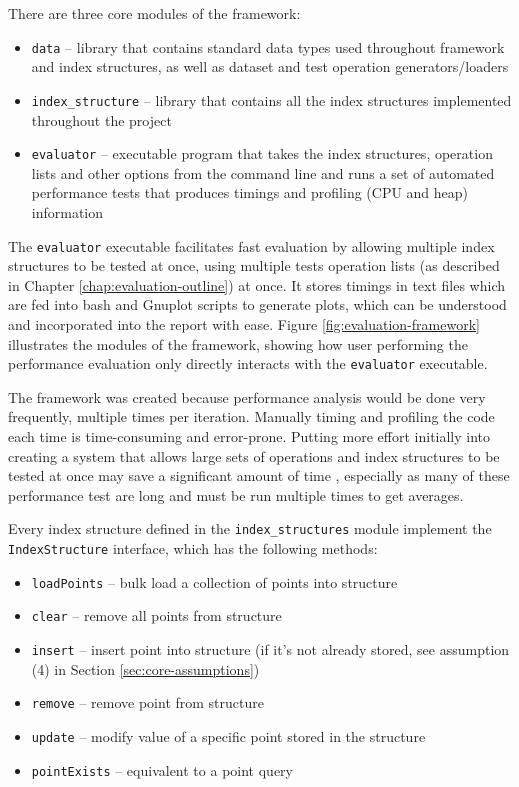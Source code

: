 There are three core modules of the framework:
\begin{itemize}
	\item \texttt{data} -- library that contains standard data types used throughout framework and index structures, as well as dataset and test operation generators/loaders
	\item \texttt{index\_structure} -- library that contains all the index structures implemented throughout the project
	\item \texttt{evaluator} -- executable program that takes the index structures, operation lists and other options from the command line and runs a set of automated performance tests that produces timings and profiling (CPU and heap) information
\end{itemize}

The \texttt{evaluator} executable facilitates fast evaluation by allowing multiple index structures to be tested at once, using multiple tests operation lists (as described in Chapter \ref{chap:evaluation-outline}) at once. It stores timings in text files which are fed into bash and Gnuplot scripts to generate plots, which can be understood and incorporated into the report with ease. Figure \ref{fig:evaluation-framework} illustrates the modules of the framework, showing how user performing the performance evaluation only directly interacts with the \texttt{evaluator} executable.

The framework was created because performance analysis would be done very frequently, multiple times per iteration. Manually timing and profiling the code each time is time-consuming and error-prone. Putting more effort initially into creating a system that allows large sets of operations and index structures to be tested at once may save a significant amount of time , especially as many of these performance test are long and must be run multiple times to get averages.

Every index structure defined in the \texttt{index\_structures} module implement the \texttt{IndexStructure} interface, which has the following methods:
\begin{itemize}
	\item \texttt{loadPoints} -- bulk load a collection of points into structure
	\item \texttt{clear} -- remove all points from structure
	\item \texttt{insert} -- insert point into structure (if it's not already stored, see assumption (4) in Section \ref{sec:core-assumptions})
	\item \texttt{remove} -- remove point from structure
	\item \texttt{update} -- modify value of a specific point stored in the structure
	\item \texttt{pointExists} -- equivalent to a point query
\end{itemize}

